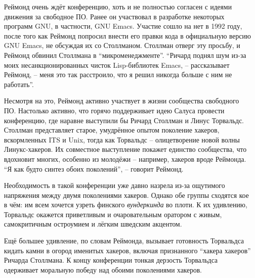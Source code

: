 Реймонд очень ждёт конференцию, хоть и не полностью согласен с идеями движения за свободное ПО. Ранее он участвовал в разработке некоторых программ GNU, в частности, GNU Emacs. Участие сошло на нет в 1992 году, после того как Реймонд попросил внести его правки кода в официальную версию GNU Emacs, не обсуждая их со Столлманом. Столлман отверг эту просьбу, и Реймонд обвинил Столлмана в \enquote{микроменеджменте}. \enquote{Ричард поднял шум из-за моих несанкционированных чисток Lisp-библиотек Emacs, -- рассказывает Реймонд, -- меня это так расстроило, что я решил никогда больше с ним не работать}.

Несмотря на это, Реймонд активно участвует в жизни сообщества свободного ПО. Настолько активно, что горячо поддерживает идею Салуса провести конференцию, где наравне выступили бы Ричард Столлман и Линус Торвальдс. Столлман представляет старое, умудрённое опытом поколение хакеров, вскормленных ITS и Unix, тогда как Торвальдс -- олицетворение новой волны Линукс-хакеров. Их совместное выступление покажет единство сообщества, что вдохновит многих, особенно из молодёжи -- например, хакеров вроде Реймонда. \enquote{Я как будто синтез обоих поколений}, -- говорит Реймонд.

Необходимость в такой конференции уже давно назрела из-за ощутимого напряжения между двумя поколениями хакеров. Однако обе группы сходятся кое в чём: им всем хочется узреть финского \textit{вундеркинда} во плоти. К их удивлению, Торвальдс окажется приветливым и очаровательным оратором с живым, самокритичным остроумием и лёгким шведским акцентом. 

Ещё большее удивление, по словам Реймонда, вызывает готовность Торвальдса кидать камни в огород именитых хакеров, включая признанного \enquote{хакера хакеров} Ричарда Столлмана. К концу конференции тонкая дерзость Торвальдса одерживает моральную победу над обоими поколениями хакеров.

